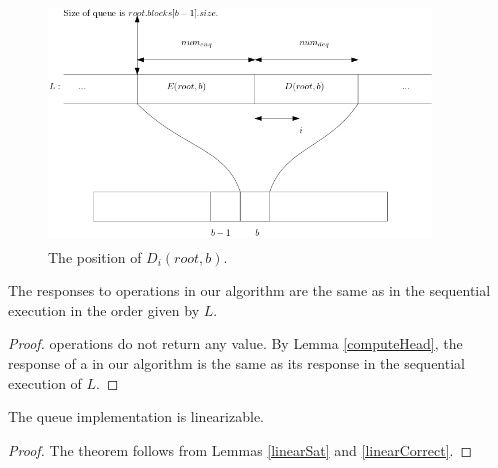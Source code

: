 \begin{figure}[hbt]  
  \center\includegraphics[width=4in, height=2.5in]{pics/computeResponseDetail.png}\caption{The position of $D_i(root,b)$.}
\label{computeResponseDetail}
\end{figure}
\vspace{-1em}

\begin{lemma}\label{linearCorrect}
The responses to operations in our algorithm are the same as in the sequential execution in the order given by $L$.
\end{lemma}
\begin{proof}
 operations do not return any value. By Lemma \ref{computeHead}, the response of a  in our algorithm is the same as its response in the sequential execution of $L$.  
\end{proof}

\begin{theorem}[Main]
The queue implementation is linearizable.
\end{theorem}
\begin{proof}
The theorem follows from Lemmas \ref{linearSat} and \ref{linearCorrect}.
\end{proof}


